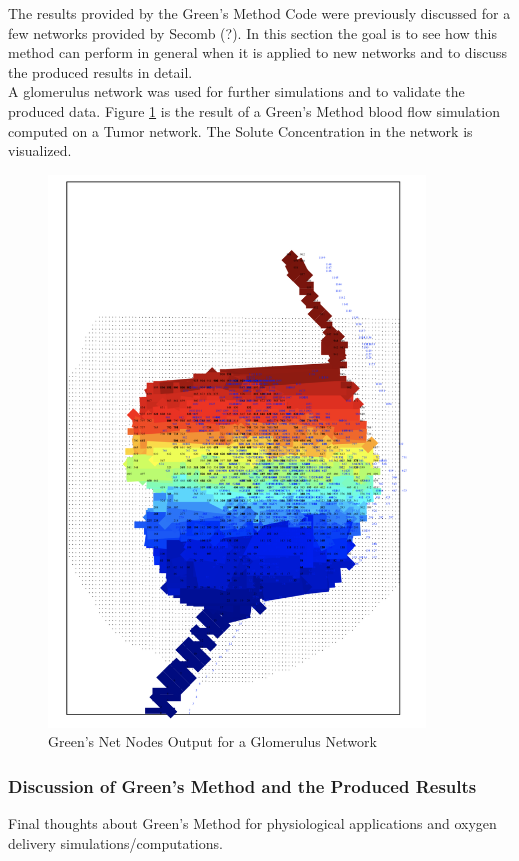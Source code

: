 The results provided by the Green's Method Code were previously discussed for a few networks provided by Secomb (?). In this section the goal is to see how this method can perform in general when it is applied to new networks and to discuss the produced results in detail.
\\A glomerulus network was used for further simulations and to validate the produced data.
Figure \ref{fig:NetNodesSegs_Glom}  is the result of a Green's Method blood flow simulation computed on a Tumor network. The Solute Concentration in the network is visualized.\\
\begin{figure}[h]
\centering
\includegraphics[width=100mm]{NetNodesSegs_Glom}
\caption{\footnotesize Green's Net Nodes Output for a Glomerulus Network}
\label{fig:NetNodesSegs_Glom}
\end{figure}

\subsubsection{Discussion of Green's Method and the Produced Results}

Final thoughts about Green's Method for physiological applications and oxygen delivery simulations/computations.

